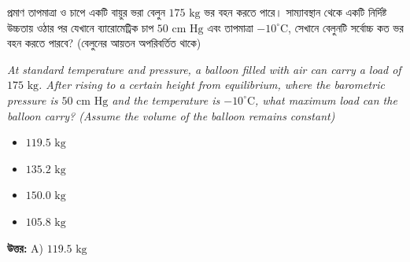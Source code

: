 \documentclass[12pt, a4paper]{article}
\begin{document}
\begin{tcolorbox}[questionbox={প্রশ্ন (Question) 16}]
    \noindent
    প্রমাণ তাপমাত্রা ও চাপে একটি বায়ুর ভরা বেলুন $175\text{ kg}$ ভর বহন করতে পারে। সাম্যাবস্থান থেকে একটি নির্দিষ্ট উচ্চতায় ওঠার পর যেখানে ব্যারোমেট্রিক চাপ $50\text{ cm Hg}$ এবং তাপমাত্রা $-10^\circ\text{C}$, সেখানে বেলুনটি সর্বোচ্চ কত ভর বহন করতে পারবে? (বেলুনের আয়তন অপরিবর্তিত থাকে)
    
    \vspace{0.8em}
    \begin{english}
    \noindent\textit{\color{darkgray}
    At standard temperature and pressure, a balloon filled with air can carry a load of $175\text{ kg}$. After rising to a certain height from equilibrium, where the barometric pressure is $50\text{ cm Hg}$ and the temperature is $-10^\circ\text{C}$, what maximum load can the balloon carry? (Assume the volume of the balloon remains constant)
    }
    \end{english}
\end{tcolorbox}

\begin{itemize}[label={}, leftmargin=1cm, itemsep=0.5em]
    \item[\textbf{A)}] $119.5\text{ kg}$
    \item[\textbf{B)}] $135.2\text{ kg}$
    \item[\textbf{C)}] $150.0\text{ kg}$
    \item[\textbf{D)}] $105.8\text{ kg}$
\end{itemize}

\vspace{0.5em}
\begin{tcolorbox}[answerbox]
    \textbf{\color{success} উত্তর:} A) $119.5\text{ kg}$
\end{tcolorbox}
\vspace{1em}
\end{document}
